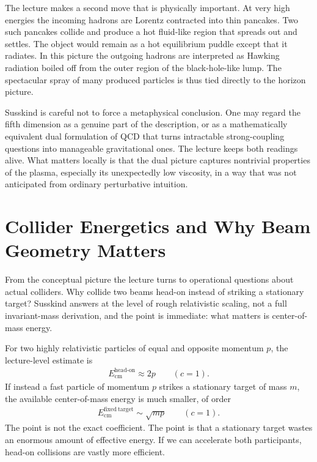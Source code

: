 The lecture makes a second move that is physically important. At very high energies the incoming hadrons are Lorentz contracted into thin pancakes. Two such pancakes collide and produce a hot fluid-like region that spreads out and settles. The object would remain as a hot equilibrium puddle except that it radiates. In this picture the outgoing hadrons are interpreted as Hawking radiation boiled off from the outer region of the black-hole-like lump. The spectacular spray of many produced particles is thus tied directly to the horizon picture.

Susskind is careful not to force a metaphysical conclusion. One may regard the fifth dimension as a genuine part of the description, or as a mathematically equivalent dual formulation of QCD that turns intractable strong-coupling questions into manageable gravitational ones. The lecture keeps both readings alive. What matters locally is that the dual picture captures nontrivial properties of the plasma, especially its unexpectedly low viscosity, in a way that was not anticipated from ordinary perturbative intuition.

\section{Collider Energetics and Why Beam Geometry Matters}

From the conceptual picture the lecture turns to operational questions about actual colliders. Why collide two beams head-on instead of striking a stationary target? Susskind answers at the level of rough relativistic scaling, not a full invariant-mass derivation, and the point is immediate: what matters is center-of-mass energy.

For two highly relativistic particles of equal and opposite momentum \(p\), the lecture-level estimate is
\begin{align}
E_{\mathrm{cm}}^{\mathrm{head\text{-}on}} \approx 2p
\qquad (c=1).
\end{align}
If instead a fast particle of momentum \(p\) strikes a stationary target of mass \(m\), the available center-of-mass energy is much smaller, of order
\begin{align}
E_{\mathrm{cm}}^{\mathrm{fixed\ target}} \sim \sqrt{mp}
\qquad (c=1).
\end{align}
The point is not the exact coefficient. The point is that a stationary target wastes an enormous amount of effective energy. If we can accelerate both participants, head-on collisions are vastly more efficient.

